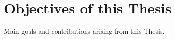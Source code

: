 \chapter{Objectives of this Thesis}
\label{sect::goals}

Main goals and contributions arising from this Thesis.